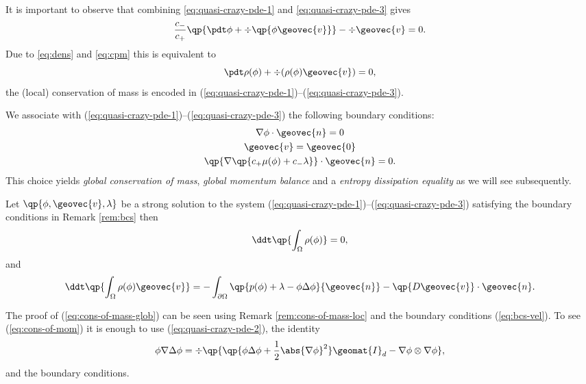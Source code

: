 \documentclass[final]{amsart}
\numberwithin{equation}{section}
\begin{document}
\begin{Rem}
  \label{rem:cons-of-mass-loc}
  It is important to observe that combining
  \eqref{eq:quasi-crazy-pde-1} and \eqref{eq:quasi-crazy-pde-3} gives
  \begin{equation}
    \label{eq:massj}
    \frac{c_-}{c_+} \qp{\pdt \phi + \div\qp{\phi{\geovec{v}}}} -  \div{{\geovec{v}}}  =0.
  \end{equation}
  Due to \eqref{eq:dens} and \eqref{eq:cpm} this is equivalent to
  \begin{equation}
    \label{eq:mass} 
    \pdt \rho(\phi)  +  \div(\rho(\phi){\geovec{v}})=0,
  \end{equation}
  \ie the (local) conservation of mass is encoded in
  (\ref{eq:quasi-crazy-pde-1})--(\ref{eq:quasi-crazy-pde-3}).
\end{Rem}

\begin{Rem}
  \label{rem:bcs}
  We associate with (\ref{eq:quasi-crazy-pde-1})--(\ref{eq:quasi-crazy-pde-3}) the following boundary conditions:
  \begin{gather}
    \nabla \phi \cdot {\geovec{n}} = 0
    \\
    \label{eq:bcs-vel}
    {\geovec{v}} = {\geovec{0}}
    \\
    \qp{\nabla\qp{c_+ \mu(\phi) + c_- \lambda}} \cdot {\geovec{n}} = 0.
  \end{gather}
  This choice yields \emph{global conservation of mass},  \emph{global momentum balance} and a \emph{entropy dissipation equality}
as we will see subsequently.
\end{Rem}
\begin{Pro}
  Let $\qp{\phi,{\geovec{v}},\lambda}$ be a strong solution to the system
  (\ref{eq:quasi-crazy-pde-1})--(\ref{eq:quasi-crazy-pde-3}) satisfying the boundary conditions in Remark \ref{rem:bcs} then
  \begin{equation}
    \label{eq:cons-of-mass-glob}
    \ddt\qp{ \int_\Omega \rho(\phi)} =0,
  \end{equation}
  and
  \begin{equation}
    \label{eq:cons-of-mom}
    \ddt \qp{\int_\Omega \rho(\phi){\geovec{v}}}
    =
    - \int_{\partial \Omega} 
    \qp{p(\phi) + \lambda - \phi \Delta \phi}{\geovec{n}}
    - \qp{D{\geovec{v}}}
    \cdot {\geovec{n}} .
  \end{equation}
\end{Pro}
\begin{Proof}    
  The proof of (\ref{eq:cons-of-mass-glob}) can be seen using Remark
  \ref{rem:cons-of-mass-loc} and the boundary conditions
  (\ref{eq:bcs-vel}). To see (\ref{eq:cons-of-mom}) it is enough to
  use (\ref{eq:quasi-crazy-pde-2}), the identity
  \begin{equation}
    \phi \nabla \Delta \phi 
    =
    \div\qp{\qp{\phi \Delta \phi 
        +
        \frac{1}{2} \abs{\nabla \phi}^2 }\geomat{I}_d 
      -
      \nabla \phi \otimes \nabla \phi},
  \end{equation}
  and the boundary conditions.
  \end{Proof}
  
\end{document}
